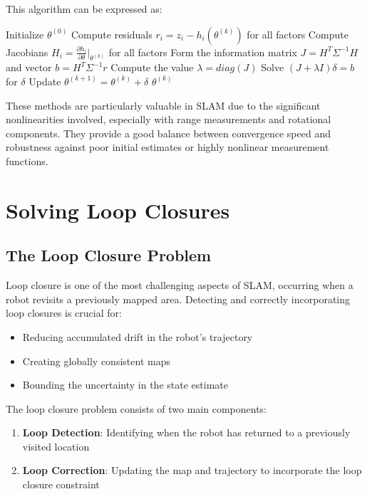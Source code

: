 \documentclass[journal]{IEEEtran}
\begin{document}
This algorithm can be expressed as:

\begin{algorithm}[H]
    \caption{Levenberg-Marquardt for SLAM}
        \begin{algorithmic}[1]
        \STATE Initialize $\theta^{(0)}$
            \STATE Compute residuals $r_i = z_i - h_i(\theta^{(k)})$ for all factors
            \STATE Compute Jacobians $H_i = \frac{\partial h_i}{\partial \theta}|_{\theta^{(k)}}$ for all factors
            \STATE Form the information matrix $J = H^T \Sigma^{-1} H$ and vector $b = H^T \Sigma^{-1} r$
            \STATE Compute the value $\lambda = diag\left(J\right)$
            \STATE Solve $(J + \lambda I) \delta = b$ for $\delta$
            \STATE Update $\theta^{(k+1)} = \theta^{(k)} + \delta$
        \ENDFOR
        \RETURN $\theta^{(k)}$
        \end{algorithmic}
    \end{algorithm}

These methods are particularly valuable in SLAM due to the significant nonlinearities involved, especially with range measurements and rotational components. They provide a good balance between convergence speed and robustness against poor initial estimates or highly nonlinear measurement functions.

\section{Solving Loop Closures}

\subsection{The Loop Closure Problem}

Loop closure is one of the most challenging aspects of SLAM, occurring when a robot revisits a previously mapped area. Detecting and correctly incorporating loop closures is crucial for:

\begin{itemize}
    \item Reducing accumulated drift in the robot's trajectory
    \item Creating globally consistent maps
    \item Bounding the uncertainty in the state estimate
\end{itemize}

The loop closure problem consists of two main components:
\begin{enumerate}
    \item \textbf{Loop Detection}: Identifying when the robot has returned to a previously visited location
    \item \textbf{Loop Correction}: Updating the map and trajectory to incorporate the loop closure constraint
\end{enumerate}
\end{document}
